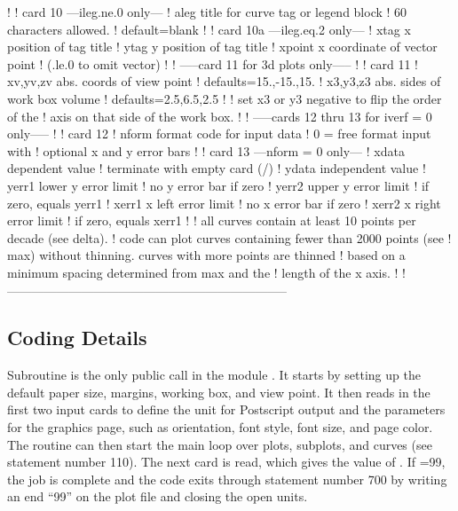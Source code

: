 \begin{ccode}
   !
   !  card 10  ---ileg.ne.0 only---
   !     aleg          title for curve tag or legend block
   !                   60 characters allowed.
   !                   default=blank
   !
   !  card 10a  ---ileg.eq.2 only---
   !     xtag          x position of tag title
   !     ytag          y position of tag title
   !     xpoint        x coordinate of vector point
   !                    (.le.0 to omit vector)
   !
   ! -----card 11 for 3d plots only-----
   !
   !  card 11
   !     xv,yv,zv      abs. coords of view point
   !                   defaults=15.,-15.,15.
   !     x3,y3,z3      abs. sides of work box volume
   !                   defaults=2.5,6.5,2.5
   !
   !         set x3 or y3 negative to flip the order of the
   !         axis on that side of the work box.
   !
   !  -----cards 12 thru 13 for iverf = 0 only-----
   !
   !  card 12
   !     nform          format code for input data
   !                    0 = free format input with
   !                    optional x and y error bars
   !
   !  card 13   ---nform = 0 only---
   !     xdata          dependent value
   !                    terminate with empty card (/)
   !     ydata          independent value
   !     yerr1          lower y error limit
   !                    no y error bar if zero
   !     yerr2          upper y error limit
   !                    if zero, equals yerr1
   !     xerr1          x left error limit
   !                    no x error bar if zero
   !     xerr2          x right error limit
   !                    if zero, equals xerr1
   !
   ! all curves contain at least 10 points per decade (see delta).
   ! code can plot curves containing fewer than 2000 points (see
   ! max) without thinning.  curves with more points are thinned
   ! based on a minimum spacing determined from max and the
   ! length of the x axis.
   !
   !--------------------------------------------------------------------
\end{ccode}
\normalsize

\subsection{Coding Details}
\label{ssPLOTR_details}

Subroutine 
is the only public call in the module
.
It starts by setting up the default paper size,
margins, working box, and view point.  It then reads in the first
two input cards to define the unit for Postscript output and the
parameters for the graphics page, such as orientation, font style,
font size, and page color. The routine can then start the main
loop over plots, subplots, and curves (see statement number 110).
The next card is read, which gives the value of .
If =99, the job is complete and the code exits
through statement number 700 by writing an end ``99'' on the plot
file and closing the open units.

